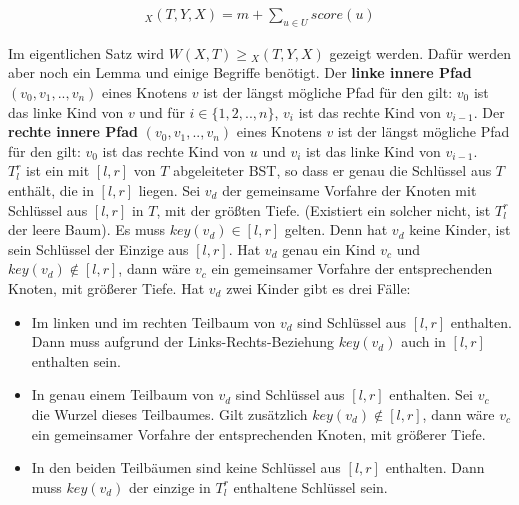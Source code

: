 \documentclass[a4paper,12pt]{article}
\begin{document}
\begin{align*}
_X(T, Y, X)  = m + \sum_{u \in U} {\mathit{score}} \left(u\right)
\end{align*} 

\noindent Im eigentlichen Satz wird $\mathit{W\left(X, T\right)} \geq {_X(T, Y, X)} $ gezeigt werden. Dafür werden aber noch ein Lemma und einige Begriffe benötigt. Der \textbf{linke innere Pfad} $\left(v_0,v_1,..,v_n \right)$ eines Knotens $v$ ist der längst mögliche Pfad für den gilt: $v_0$ ist das linke Kind von $v$ und für $i \in \{1, 2,..,n\}$, $v_i$ ist das rechte Kind von $v_{i-1}$. Der \textbf{rechte innere Pfad} $\left(v_0,v_1,..,v_n \right)$ eines Knotens $v$ ist der längst mögliche Pfad für den gilt: $v_0$ ist das rechte Kind von $u$ und $v_i$ ist das linke Kind von $v_{i-1}$.\\ $T^r_l$ ist ein mit $\left[l,r\right]$ von $T$ abgeleiteter BST, so dass er genau die Schlüssel aus $T$ enthält, die in $\left[l, r\right]$ liegen. Sei $v_d$ der gemeinsame Vorfahre der Knoten mit Schlüssel aus  $\left[l,r\right]$ in $T$, mit der größten Tiefe. (Existiert ein solcher nicht, ist $T^r_l$ der leere Baum). Es muss $\mathit{key}(v_d) \in \left[l,r\right]$ gelten. Denn hat $v_d$ keine Kinder, ist sein Schlüssel der Einzige aus $\left[l,r\right]$. Hat $v_d$ genau ein Kind $v_{c}$ und $\mathit{key}(v_d) \notin \left[l,r\right]$, dann wäre $v_{c}$ ein gemeinsamer Vorfahre der entsprechenden Knoten, mit größerer Tiefe. Hat $v_d$ zwei Kinder gibt es drei Fälle:
\begin{itemize}
	\item Im linken und im rechten Teilbaum von $v_d$ sind Schlüssel aus $\left[l,r\right]$ enthalten. Dann muss aufgrund der Links-Rechts-Beziehung  $\mathit{key}(v_d)$ auch in $\left[l,r\right]$ enthalten sein.
	\item In genau einem Teilbaum von $v_d$ sind Schlüssel aus $\left[l,r\right]$ enthalten. Sei $v_{c}$ die Wurzel dieses Teilbaumes. Gilt zusätzlich $\mathit{key}(v_d) \notin \left[l , r\right]$, dann wäre $v_c$ ein  gemeinsamer Vorfahre der entsprechenden Knoten, mit größerer Tiefe.
	\item In den beiden Teilbäumen sind keine Schlüssel aus $\left[l,r\right]$ enthalten.  Dann muss $\mathit{key}(v_d)$ der einzige in $T^r_l$ enthaltene Schlüssel sein.
\end{itemize}
\end{document}
